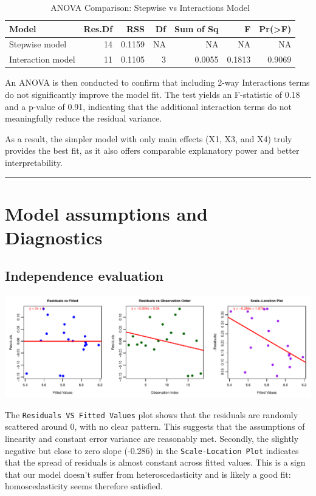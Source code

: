 \documentclass[
  11pt,
]{article}
\begin{document}
\begin{table}[!h]
\centering
\caption{\label{tab:unnamed-chunk-18}ANOVA Comparison: Stepwise vs Interactions Model}
\centering
\fontsize{8}{10}\selectfont
\begin{tabular}[t]{lrrrrrr}
\toprule
Model & Res.Df & RSS & Df & Sum of Sq & F & Pr(>F)\\
\midrule
Stepwise model & 14 & 0.1159 & NA & NA & NA & NA\\
Interaction model & 11 & 0.1105 & 3 & 0.0055 & 0.1813 & 0.9069\\
\bottomrule
\end{tabular}
\end{table}

An ANOVA is then conducted to confirm that including 2-way Interactions
terms do not significantly improve the model fit. The test yields an
F-statistic of 0.18 and a p-value of 0.91, indicating that the
additional interaction terms do not meaningfully reduce the residual
variance.

As a result, the simpler model with only main effects (X1, X3, and X4)
truly provides the best fit, as it also offers comparable explanatory
power and better interpretability.

\begin{center}\rule{0.5\linewidth}{0.5pt}\end{center}

\section{Model assumptions and
Diagnostics}\label{model-assumptions-and-diagnostics}

\subsection{Independence evaluation}\label{independence-evaluation}

\includegraphics{Figs/unnamed-chunk-19-1.pdf}

The \texttt{Residuals\ VS\ Fitted\ Values} plot shows that the residuals
are randomly scattered around 0, with no clear pattern. This suggests
that the assumptions of linearity and constant error variance are
reasonably met. Secondly, the slightly negative but close to zero slope
(-0.286) in the \texttt{Scale-Location\ Plot} indicates that the spread
of residuals is almost constant across fitted values. This is a sign
that our model doesn't suffer from heteroscedasticity and is likely a
good fit: homoscedasticity seems therefore satisfied.
\end{document}
